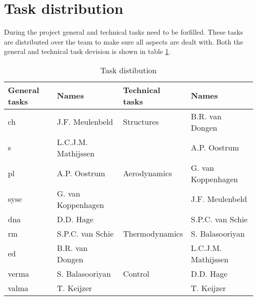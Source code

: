 \section{Task distribution}
During the project general and technical tasks need to be forfilled. These tasks are distributed over the team to make sure all aspects are dealt with. Both the general and technical task devision is shown in table \ref{tab:taskdist}.

\begin{table}[H]
	\caption {Task distibution}
    \begin{tabular}{|p{}|p{}||p{}|p{}|}
    \hline
    General tasks       & Names      & Technical tasks    & Names                    
\\ \hline \hline
    \gls{ch}                      & J.F. Meulenbeld        & Structures           & B.R. van Dongen
\\ \hline
    \gls{s}                      & L.C.J.M. Mathijssen    & ~                    & A.P. Oostrum 
\\ \hline
    \gls{pl}                       & A.P. Oostrum           & Aerodynamics         & G. van Koppenhagen        
\\ \hline
    \gls{syse}            & G. van Koppenhagen     & ~                    & J.F. Meulenbeld             
\\ \hline
    \gls{dna}  & D.D. Hage              & ~                    & S.P.C. van Schie                       
\\ \hline
    \gls{rm}                  & S.P.C. van Schie       & Thermodynamics               & S. Balasooriyan                       
\\ \hline
    \gls{ed}                        & B.R. van Dongen        & ~                    & L.C.J.M. Mathijssen                        
\\ \hline
    \gls{verma}       & S. Balasooriyan        & Control              & D.D. Hage                       
\\ \hline
    \gls{valma}         & T. Keijzer             & ~                    & T. Keijzer                        
\\ \hline
    \end{tabular}
    \label{tab:taskdist}
\end{table}